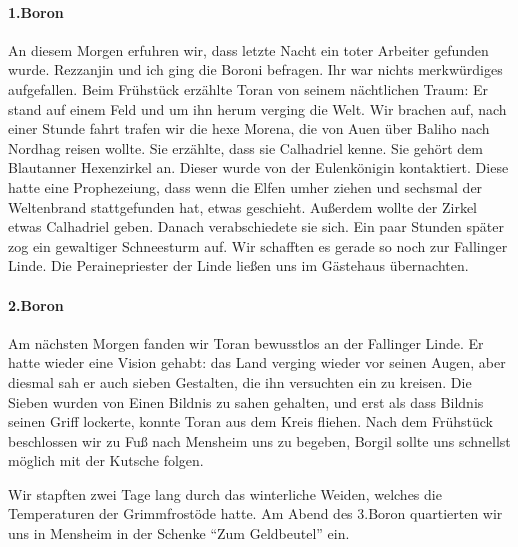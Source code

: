 \paragraph{1.Boron}
An diesem Morgen erfuhren wir, dass letzte Nacht ein toter Arbeiter gefunden wurde. Rezzanjin und ich ging die Boroni befragen. Ihr war nichts merkwürdiges aufgefallen. Beim Frühstück erzählte Toran von seinem nächtlichen Traum: Er stand auf einem Feld und um ihn herum verging die Welt. Wir brachen auf, nach einer Stunde fahrt trafen wir die hexe Morena, die von Auen über Baliho nach Nordhag reisen wollte. Sie erzählte, dass sie Calhadriel kenne. Sie gehört dem Blautanner Hexenzirkel an. Dieser wurde von der Eulenkönigin kontaktiert. Diese hatte eine Prophezeiung, dass wenn die Elfen umher ziehen und sechsmal der Weltenbrand stattgefunden hat, etwas geschieht. Außerdem wollte der Zirkel etwas Calhadriel geben. Danach verabschiedete sie sich. Ein paar Stunden später zog ein gewaltiger Schneesturm auf. Wir schafften es gerade so noch zur Fallinger Linde. Die Perainepriester der Linde ließen uns im Gästehaus übernachten.

\paragraph{2.Boron}
Am nächsten Morgen fanden wir Toran bewusstlos an der Fallinger Linde. Er hatte wieder eine Vision gehabt: das Land verging wieder vor seinen Augen, aber diesmal sah er auch sieben Gestalten, die ihn versuchten ein zu kreisen. Die Sieben wurden von Einen Bildnis zu sahen gehalten, und erst als dass Bildnis seinen Griff lockerte, konnte Toran aus dem Kreis fliehen. Nach dem Frühstück beschlossen wir zu Fuß nach Mensheim uns zu begeben, Borgil sollte uns schnellst möglich mit der Kutsche folgen.

Wir stapften zwei Tage lang durch das winterliche Weiden, welches die Temperaturen der Grimmfrostöde hatte. Am Abend des 3.Boron quartierten wir uns in Mensheim in der Schenke ``Zum Geldbeutel'' ein.

